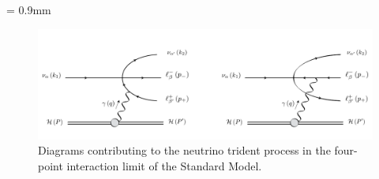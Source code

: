 \unitlength = 0.9mm
\begin{figure}[t]
\centering\includegraphics[width=\textwidth]{tridentSM/figs/Neutrino_trident_production.pdf}
\caption{Diagrams contributing to the neutrino trident process in the four-point interaction limit of the Standard Model.  
\label{fig:Tdiagrams}}
\end{figure}
